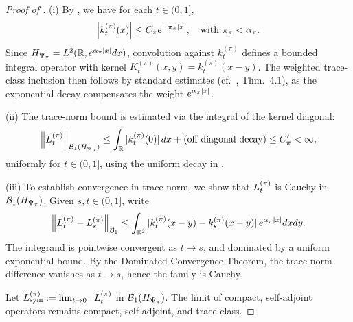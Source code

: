 \begin{proof}[Proof of ]
\leavevmode

(i) By , we have for each \( t \in (0,1] \),
\[
\left|k_t^{(\pi)}(x)\right| \leq C_\pi e^{-\pi_\pi |x|}, \quad \text{with } \pi_\pi < \alpha_{\pi}.
\]
Since \( H_{\Psi_{\pi}} = L^2(\mathbb{R}, e^{\alpha_{\pi} |x|} dx) \), convolution against \( k_t^{(\pi)} \) defines a bounded integral operator with kernel \( K_t^{(\pi)}(x, y) = k_t^{(\pi)}(x - y) \). The weighted trace-class inclusion then follows by standard estimates (cf.~\cite{Simon2005TraceIdeals}, Thm.~4.1), as the exponential decay compensates the weight \( e^{\alpha_{\pi} |x|} \).

(ii) The trace-norm bound is estimated via the integral of the kernel diagonal:
\[
\left\|L_t^{(\pi)}\right\|_{\mathcal{B}_1(H_{\Psi_{\pi}})} \leq \int_{\mathbb{R}} |k_t^{(\pi)}(0)| \, dx + \text{(off-diagonal decay)} \leq C_\pi' < \infty,
\]
uniformly for \( t \in (0,1] \), using the uniform decay in .

(iii) To establish convergence in trace norm, we show that \( L_t^{(\pi)} \) is Cauchy in \( \mathcal{B}_1(H_{\Psi_{\pi}}) \). Given \( s, t \in (0,1] \), write
\[
\left\|L_t^{(\pi)} - L_s^{(\pi)}\right\|_{\mathcal{B}_1} \leq \int_{\mathbb{R}^2} |k_t^{(\pi)}(x - y) - k_s^{(\pi)}(x - y)| \, e^{\alpha_{\pi} |x|} dx dy.
\]
The integrand is pointwise convergent as \( t \to s \), and dominated by a uniform exponential bound. By the Dominated Convergence Theorem, the trace norm difference vanishes as \( t \to s \), hence the family is Cauchy.

Let \( L_{\mathrm{sym}}^{(\pi)} := \lim_{t \to 0^+} L_t^{(\pi)} \) in \( \mathcal{B}_1(H_{\Psi_{\pi}}) \). The limit of compact, self-adjoint operators remains compact, self-adjoint, and trace class.
\end{proof}
